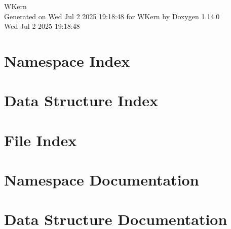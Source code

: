 \documentclass[twoside]{book}
\newcommand{\+}{\discretionary{\mbox{\scriptsize$\hookleftarrow$}}{}{}}
\newcommand{\clearemptydoublepage}{%
    \newpage{\pagestyle{empty}\cleardoublepage}%
  }
\begin{document}
  \raggedbottom
    \hypersetup{pageanchor=false,
                bookmarksnumbered=true,
                pdfencoding=unicode
               }
  \begin{titlepage}
  \vspace*{7cm}
  \begin{center}%
  {\Large WKern}\\
  \vspace*{1cm}
  {\large Generated on Wed Jul 2 2025 19\+:18\+:48 for WKern by Doxygen 1.14.0}\\
    \vspace*{0.5cm}
    {\small Wed Jul 2 2025 19:18:48}
  \end{center}
  \end{titlepage}
  \clearemptydoublepage
  \tableofcontents
  \clearemptydoublepage
  \hypersetup{pageanchor=true}

\chapter{Namespace Index}

\chapter{Data Structure Index}

\chapter{File Index}

\chapter{Namespace Documentation}







\chapter{Data Structure Documentation}














\end{document}
